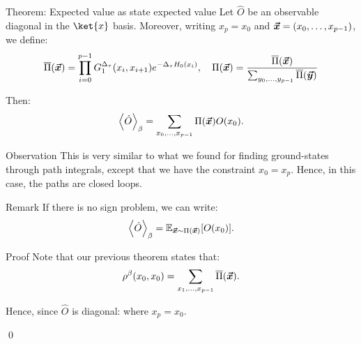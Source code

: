 \documentclass[a4paper]{article}
\begin{document}
\begin{parag}{Theorem: Expected value as state expected value}
    Let $\hat{O}$ be an observable diagonal in the $\ket{x}$ basis. Moreover, writing $x_p = x_0$ and $\bvec{x} = \left(x_0, \ldots, x_{p-1}\right)$, we define: 
    \[\bar{\Pi}\left(\bvec{x}\right) = \prod_{i=0}^{p-1} G_1^{\Delta_{\tau}}\left(x_i, x_{i+1}\right) e^{- \Delta_{\tau} H_0\left(x_i\right)}, \mathspace \Pi\left(\bvec{x}\right) = \frac{\bar{\Pi}\left(\bvec{x}\right)}{\sum_{y_0, \ldots, y_{p-1}} \bar{\Pi}\left(\bvec{y}\right)}\]
    
    Then: 
    \[\left\langle \hat{O} \right\rangle_{\beta} = \sum_{x_0, \ldots, x_{p-1}} \Pi\left(\bvec{x}\right) O\left(x_0\right).\]

    \begin{subparag}{Observation}
        This is very similar to what we found for finding ground-states through path integrals, except that we have the constraint $x_0 = x_p$. Hence, in this case, the paths are closed loops.
    \end{subparag}

    \begin{subparag}{Remark}
        If there is no sign problem, we can write: 
        \[\left\langle \hat{O} \right\rangle_{\beta} = \exval_{\bvec{x} \followsdistr \Pi\left(\bvec{x}\right)}\left[O\left(x_0\right)\right].\]
    \end{subparag}

    \begin{subparag}{Proof}
        Note that our previous theorem states that: 
        \[\rho^{\beta}\left(x_0, x_0\right) = \sum_{x_1, \ldots, x_{p-1}} \bar{\Pi}\left(\bvec{x}\right).\]


        Hence, since $\hat{O}$ is diagonal: 
        where $x_p = x_0$.

        \qed
    \end{subparag}
\end{parag}
\end{document}
